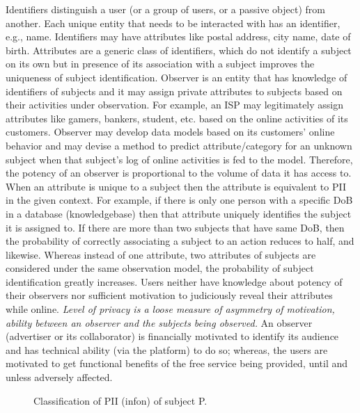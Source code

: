 \documentclass[a4paper,twoside]{article}
\begin{document}
Identifiers distinguish a user (or a group of users, or a passive
object) from another. Each unique entity that needs to be interacted
with has an identifier, e.g., name. Identifiers may have attributes
like postal address, city name, date of birth. Attributes are a
generic class of identifiers, which do not identify a subject on its
own but in presence of its association with a subject improves the
uniqueness of subject identification. Observer is an entity that has
knowledge of identifiers of subjects and it may assign private
attributes to subjects based on their activities under
observation. For example, an ISP may legitimately assign attributes
like gamers, bankers, student, etc. based on the online activities of
its customers. Observer may develop data models based on its
customers' online behavior and may devise a method to predict
attribute/category for an unknown subject when that subject's log of
online activities is fed to the model. Therefore, the potency of an
observer is proportional to the volume of data it has access to. When
an attribute is unique to a subject then the attribute is equivalent
to PII in the given context. For example, if there is only one person
with a specific DoB in a database (knowledgebase) then that attribute
uniquely identifies the subject it is assigned to. If there are more
than two subjects that have same DoB, then the probability of
correctly associating a subject to an action reduces to half, and
likewise. Whereas instead of one attribute, two attributes of subjects
are considered under the same observation model, the probability of
subject identification greatly increases. Users neither have knowledge
about potency of their observers nor sufficient motivation to
judiciously reveal their attributes while online. \textit{Level of
  privacy is a loose measure of asymmetry of motivation, ability
  between an observer and the subjects being observed.} An observer
(advertiser or its collaborator) is financially motivated to identify
its audience and has technical ability (via the platform) to do so;
whereas, the users are motivated to get functional benefits of the
free service being provided, until and unless adversely affected.
\begin{figure}[!htp]
  \centering
  {}
  \caption{Classification of PII (infon) of subject P.}
  \label{fig:personal-info-classification}
\end{figure}
\end{document}
